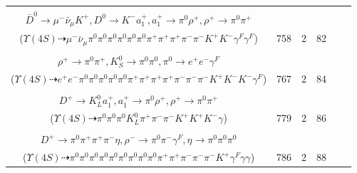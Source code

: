 \documentclass[landscape]{article}
\newcounter{rownumbers}
\newcommand\rn{\stepcounter{rownumbers}\arabic{rownumbers}}
\newcommand{\EOLP}{\\ \hline} %
\newcommand{\topoTags}[1]{#1} %
\begin{document}
\begin{longtable}{clcccc}
\rn & \makecell[l]{ $ 
\Upsilon(4S) \rightarrow B^{0} \bar{B}^{0} ,
B^{0} \rightarrow \pi^{0} \bar{D}^{*0} ,
\bar{B}^{0} \rightarrow \pi^{0} \pi^{-} \pi^{-} \rho^{+} D^{*+} \gamma^{F} \gamma^{F} ,
\bar{D}^{*0} \rightarrow \pi^{0} \bar{D}^{0} ,
\rho^{+} \rightarrow \pi^{0} \pi^{+} ,
D^{*+} \rightarrow \pi^{+} D^{0} ,
$ \\ $
\bar{D}^{0} \rightarrow \mu^{-} \bar{\nu}_{\mu} K^{+} ,
D^{0} \rightarrow K^{-} a_{1}^{+} ,
a_{1}^{+} \rightarrow \pi^{0} \rho^{+} ,
\rho^{+} \rightarrow \pi^{0} \pi^{+} 
$ \\ ($
\Upsilon(4S) \dashrightarrow \mu^{-} \bar{\nu}_{\mu} \pi^{0} \pi^{0} \pi^{0} \pi^{0} \pi^{0} \pi^{0} \pi^{+} \pi^{+} \pi^{+} \pi^{-} \pi^{-} K^{+} K^{-} \gamma^{F} \gamma^{F} 
$) } & \topoTags{758 & }2 & 82 \EOLP

\rn & \makecell[l]{ $ 
\Upsilon(4S) \rightarrow B^{0} \bar{B}^{0} ,
B^{0} \rightarrow \pi^{0} \pi^{0} \pi^{-} K^{+} ,
\bar{B}^{0} \rightarrow \pi^{0} \pi^{+} \pi^{-} \pi^{-} K^{-} K^{*+} D^{+} ,
K^{*+} \rightarrow \pi^{+} K^{0} ,
D^{+} \rightarrow \pi^{+} \rho^{+} K^{-} ,
K^{0} \rightarrow K_{S}^{0} ,
$ \\ $
\rho^{+} \rightarrow \pi^{0} \pi^{+} ,
K_{S}^{0} \rightarrow \pi^{0} \pi^{0} ,
\pi^{0} \rightarrow e^{+} e^{-} \gamma^{F} 
$ \\ ($
\Upsilon(4S) \dashrightarrow e^{+} e^{-} \pi^{0} \pi^{0} \pi^{0} \pi^{0} \pi^{0} \pi^{+} \pi^{+} \pi^{+} \pi^{+} \pi^{-} \pi^{-} \pi^{-} K^{+} K^{-} K^{-} \gamma^{F} 
$) } & \topoTags{767 & }2 & 84 \EOLP

\rn & \makecell[l]{ $ 
\Upsilon(4S) \rightarrow B^{0} \bar{B}^{0} ,
B^{0} \rightarrow \pi^{0} K^{*}(1680)^{0} ,
\bar{B}^{0} \rightarrow D^{*+} D_{s}^{-} ,
K^{*}(1680)^{0} \rightarrow \pi^{-} K^{+} ,
D^{*+} \rightarrow D^{+} \gamma ,
D_{s}^{-} \rightarrow \pi^{-} K^{+} K^{-} ,
$ \\ $
D^{+} \rightarrow K_{L}^{0} a_{1}^{+} ,
a_{1}^{+} \rightarrow \pi^{0} \rho^{+} ,
\rho^{+} \rightarrow \pi^{0} \pi^{+} 
$ \\ ($
\Upsilon(4S) \dashrightarrow \pi^{0} \pi^{0} \pi^{0} K_{L}^{0} \pi^{+} \pi^{-} \pi^{-} K^{+} K^{+} K^{-} \gamma 
$) } & \topoTags{779 & }2 & 86 \EOLP

\rn & \makecell[l]{ $ 
\Upsilon(4S) \rightarrow B^{0} \bar{B}^{0} ,
B^{0} \rightarrow K^{+} a_{1}^{-} ,
\bar{B}^{0} \rightarrow \pi^{0} \pi^{0} \rho^{-} \eta D^{+} ,
a_{1}^{-} \rightarrow \pi^{0} \rho^{-} ,
\rho^{-} \rightarrow \pi^{0} \pi^{-} ,
\eta \rightarrow \gamma \gamma ,
$ \\ $
D^{+} \rightarrow \pi^{0} \pi^{+} \pi^{+} \pi^{-} \eta ,
\rho^{-} \rightarrow \pi^{0} \pi^{-} \gamma^{F} ,
\eta \rightarrow \pi^{0} \pi^{0} \pi^{0} 
$ \\ ($
\Upsilon(4S) \dashrightarrow \pi^{0} \pi^{0} \pi^{0} \pi^{0} \pi^{0} \pi^{0} \pi^{0} \pi^{0} \pi^{0} \pi^{+} \pi^{+} \pi^{-} \pi^{-} \pi^{-} K^{+} \gamma^{F} \gamma \gamma 
$) } & \topoTags{786 & }2 & 88 \EOLP


\end{longtable}
\end{document}
